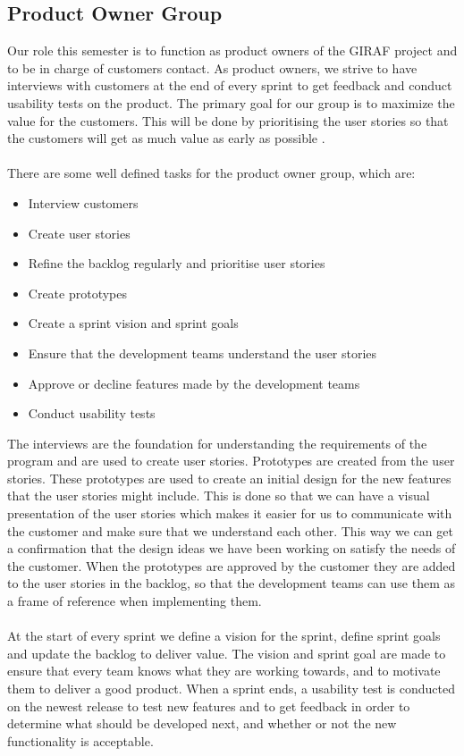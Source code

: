 \subsection{Product Owner Group}
Our role this semester is to function as product owners of the GIRAF project and to be in charge of customers contact. 
As product owners, we strive to have interviews with customers at the end of every sprint to get feedback and conduct usability tests on the product.
The primary goal for our group is to maximize the value for the customers. 
This will be done by prioritising the user stories so that the customers will get as much value as early as possible \autocite{TheScrumGuide}.\\
\\
There are some well defined tasks for the product owner group, which are:
\begin{itemize}
    \item Interview customers
    \item Create user stories    
    \item Refine the backlog regularly and prioritise user stories
    \item Create prototypes
    \item Create a sprint vision and sprint goals
    \item Ensure that the development teams understand the user stories
    \item Approve or decline features made by the development teams
    \item Conduct usability tests
\end{itemize}
\noindent
The interviews are the foundation for understanding the requirements of the program and are used to create user stories. 
Prototypes are created from the user stories.
These prototypes are used to create an initial design for the new features that the user stories might include. 
This is done so that we can have a visual presentation of the user stories which makes it easier for us to communicate with the customer and make sure that we understand each other. 
This way we can get a confirmation that the design ideas we have been working on satisfy the needs of the customer.
When the prototypes are approved by the customer they are added to the user stories in the backlog, so that the development teams can use them as a frame of reference when implementing them.
\\\\
At the start of every sprint we define a vision for the sprint, define sprint goals and update the backlog to deliver value. 
The vision and sprint goal are made to ensure that every team knows what they are working towards, and to motivate them to deliver a good product.
When a sprint ends, a usability test is conducted on the newest release to test new features and to get feedback in order to determine what should be developed next, and whether or not the new functionality is acceptable.

